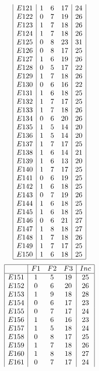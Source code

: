 \documentclass[12pt]{article}
\begin{document}
\begin{multicols}{3}
\begin{equation*}
\begin{array}{|c|ccc|c|}
E121&1&6&17&24\\
E122&0&7&19&26\\
E123&1&7&18&26\\
E124&1&7&18&26\\
E125&0&8&23&31\\
E126&0&8&17&25\\
E127&1&6&19&26\\
E128&0&5&17&22\\
E129&1&7&18&26\\
E130&0&6&16&22\\
E131&1&6&18&25\\
E132&1&7&17&25\\
E133&1&7&18&26\\
E134&0&6&20&26\\
E135&1&5&14&20\\
E136&1&5&14&20\\
E137&1&7&17&25\\
E138&1&6&14&21\\
E139&1&6&13&20\\
E140&1&7&17&25\\
E141&0&6&19&25\\
E142&1&6&18&25\\
E143&0&7&19&26\\
E144&1&6&18&25\\
E145&1&6&18&25\\
E146&0&6&21&27\\
E147&1&8&18&27\\
E148&1&7&18&26\\
E149&1&7&17&25\\
E150&1&6&18&25\\
\hline
\end{array}
\end{equation*}
\begin{equation*}
\begin{array}{|c|ccc|c|}
\hline
&F1&F2&F3&Inc\\
\hline
E151&1&5&19&25\\
E152&0&6&20&26\\
E153&1&9&18&28\\
E154&0&6&17&23\\
E155&0&7&17&24\\
E156&1&6&16&23\\
E157&1&5&18&24\\
E158&0&8&17&25\\
E159&1&7&18&26\\
E160&1&8&18&27\\
E161&0&7&17&24\\

\end{array}
\end{equation*}
\end{multicols}
\end{document}
